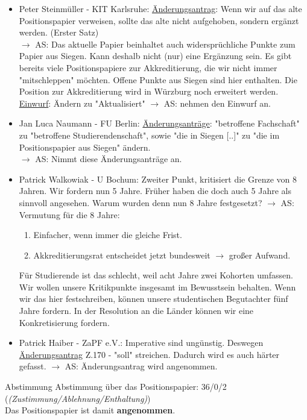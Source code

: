 \begin{itemize}
      \item Peter Steinmüller - KIT Karlsruhe:  \underline{Änderungsantrag}: Wenn wir auf das alte Positionspapier verweisen, sollte das alte nicht aufgehoben, sondern ergänzt werden. (Erster Satz) \\
        $\rightarrow$ AS: Das aktuelle Papier beinhaltet auch widersprüchliche Punkte zum Papier aus Siegen. Kann deshalb nicht (nur) eine Ergänzung sein. Es gibt bereits viele Positionspapiere zur Akkreditierung, die wir nicht immer "mitschleppen" möchten. Offene Punkte aus Siegen sind hier enthalten. Die Position zur Akkreditierung wird in Würzburg noch erweitert werden. \\
        \underline{Einwurf}: Ändern zu "Aktualisiert"
          $\rightarrow$ AS: nehmen den Einwurf an.
      \item Jan Luca Naumann - FU Berlin:  \underline{Änderungsanträge}: "betroffene Fachschaft" zu "betroffene Studierendenschaft", sowie "die in Siegen [..]" zu "die im Positionspapier aus Siegen" ändern. \\
        $\rightarrow$ AS: Nimmt diese Änderungsanträge an.
      \item Patrick Walkowiak - U Bochum: Zweiter Punkt, kritisiert die Grenze von 8 Jahren. Wir fordern nun 5 Jahre. Früher haben die doch auch 5 Jahre als sinnvoll angesehen. Warum wurden denn nun 8 Jahre festgesetzt?
        $\rightarrow$ AS: Vermutung für die 8 Jahre:
        \begin{enumerate}
          \item Einfacher, wenn immer die gleiche Frist.
          \item Akkreditierungsrat entscheidet jetzt bundesweit $\rightarrow$ großer Aufwand.
        \end{enumerate}
        Für Studierende ist das schlecht, weil acht Jahre zwei Kohorten umfassen.
        Wir wollen unsere Kritikpunkte insgesamt im Bewusstsein behalten.
        Wenn wir das hier festschreiben, können unsere studentischen Begutachter fünf Jahre fordern.
        In der Resolution an die Länder können wir eine Konkretisierung fordern.
      \item Patrick Haiber - ZaPF e.V.: Imperative sind ungünstig. Deswegen \underline{Änderungsantrag} Z.170 - "soll" streichen. Dadurch wird es auch härter gefasst.
        $\rightarrow$ AS: Änderungsantrag wird angenommen.
    \end{itemize}

    \begin{success}{Abstimmung}
      Abstimmung über das Positionspapier: 36/0/2 (\textit{(Zustimmung/Ablehnung/Enthaltung)}) \\
      Das Positionspapier ist damit \textbf{angenommen}.
    \end{success}

